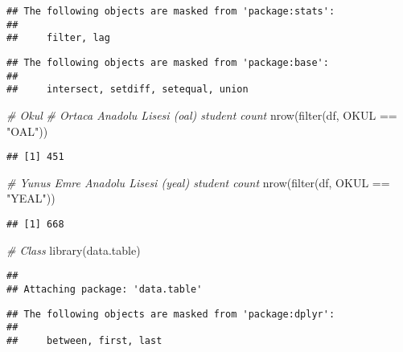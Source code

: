\documentclass[
]{article}
\newenvironment{Shaded}{\begin{snugshade}}{\end{snugshade}}
\newcommand{\CommentTok}[1]{\textcolor[rgb]{0.56,0.35,0.01}{\textit{#1}}}
\newcommand{\FunctionTok}[1]{\textcolor[rgb]{0.00,0.00,0.00}{#1}}
\newcommand{\NormalTok}[1]{#1}
\newcommand{\SpecialCharTok}[1]{\textcolor[rgb]{0.00,0.00,0.00}{#1}}
\newcommand{\StringTok}[1]{\textcolor[rgb]{0.31,0.60,0.02}{#1}}
\begin{document}
\begin{verbatim}
## The following objects are masked from 'package:stats':
## 
##     filter, lag
\end{verbatim}

\begin{verbatim}
## The following objects are masked from 'package:base':
## 
##     intersect, setdiff, setequal, union
\end{verbatim}

\begin{Shaded}
\begin{Highlighting}[]
\CommentTok{\# Okul}
\CommentTok{\# Ortaca Anadolu Lisesi (oal) student count}
\FunctionTok{nrow}\NormalTok{(}\FunctionTok{filter}\NormalTok{(df, OKUL }\SpecialCharTok{==} \StringTok{"OAL"}\NormalTok{))}
\end{Highlighting}
\end{Shaded}

\begin{verbatim}
## [1] 451
\end{verbatim}

\begin{Shaded}
\begin{Highlighting}[]
\CommentTok{\# Yunus Emre Anadolu Lisesi (yeal) student count}
\FunctionTok{nrow}\NormalTok{(}\FunctionTok{filter}\NormalTok{(df, OKUL }\SpecialCharTok{==} \StringTok{"YEAL"}\NormalTok{))}
\end{Highlighting}
\end{Shaded}

\begin{verbatim}
## [1] 668
\end{verbatim}

\begin{Shaded}
\begin{Highlighting}[]
\CommentTok{\# Class}
\FunctionTok{library}\NormalTok{(data.table)}
\end{Highlighting}
\end{Shaded}

\begin{verbatim}
## 
## Attaching package: 'data.table'
\end{verbatim}

\begin{verbatim}
## The following objects are masked from 'package:dplyr':
## 
##     between, first, last
\end{verbatim}
\end{document}
